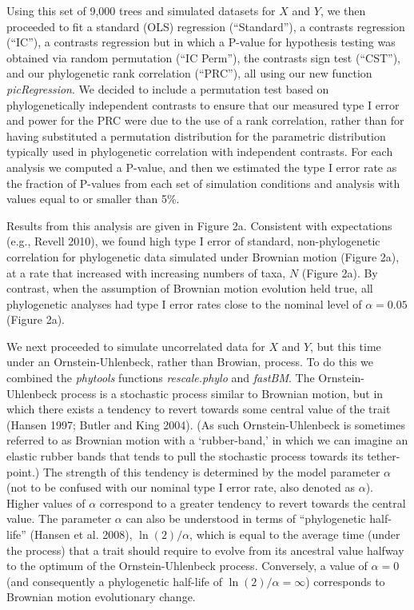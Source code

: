 \documentclass[fleqn,10pt,lineno]{wlpeerj} %
\begin{document}
Using this set of 9,000 trees and simulated datasets for \(X\) and \(Y\), we then proceeded to fit a standard (OLS) regression (``Standard''), a contrasts regression (``IC''), a contrasts regression but in which a P-value for hypothesis testing was obtained via random permutation (``IC Perm''), the contrasts sign test (``CST''), and our phylogenetic rank correlation (``PRC''), all using our new function \emph{picRegression}. We decided to include a permutation test based on phylogenetically independent contrasts to ensure that our measured type I error and power for the PRC were due to the use of a rank correlation, rather than for having substituted a permutation distribution for the parametric distribution typically used in phylogenetic correlation with independent contrasts. For each analysis we computed a P-value, and then we estimated the type I error rate as the fraction of P-values from each set of simulation conditions and analysis with values equal to or smaller than 5\%.

Results from this analysis are given in Figure 2a. Consistent with expectations (e.g., Revell 2010), we found high type I error of standard, non-phylogenetic correlation for phylogenetic data simulated under Brownian motion (Figure 2a), at a rate that increased with increasing numbers of taxa, \(N\) (Figure 2a). By contrast, when the assumption of Brownian motion evolution held true, all phylogenetic analyses had type I error rates close to the nominal level of \(\alpha = 0.05\) (Figure 2a).

We next proceeded to simulate uncorrelated data for \(X\) and \(Y\), but this time under an Ornstein-Uhlenbeck, rather than Browian, process. To do this we combined the \emph{phytools} functions \emph{rescale.phylo} and \emph{fastBM}. The Ornstein-Uhlenbeck process is a stochastic process similar to Brownian motion, but in which there exists a tendency to revert towards some central value of the trait (Hansen 1997; Butler and King 2004). (As such Ornstein-Uhlenbeck is sometimes referred to as Brownian motion with a `rubber-band,' in which we can imagine an elastic rubber bands that tends to pull the stochastic process towards its tether-point.) The strength of this tendency is determined by the model parameter \(\alpha\) (not to be confused with our nominal type I error rate, also denoted as \(\alpha\)). Higher values of \(\alpha\) correspond to a greater tendency to revert towards the central value. The parameter \(\alpha\) can also be understood in terms of ``phylogenetic half-life'' (Hansen et al. 2008), \(\ln(2)/\alpha\), which is equal to the average time (under the process) that a trait should require to evolve from its ancestral value halfway to the optimum of the Ornstein-Uhlenbeck process. Conversely, a value of \(\alpha = 0\) (and consequently a phylogenetic half-life of \(\ln(2)/\alpha = \infty\)) corresponds to Brownian motion evolutionary change.
\end{document}
